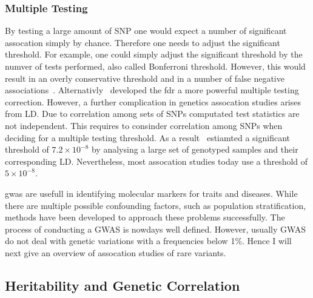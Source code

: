 \subsubsection{Multiple Testing}
\label{ssub:multiple_testing}
By testing a large amount of SNP one would expect a number of significant assocation simply by chance.
Therefore one needs to adjust the significant threshold.
For example, one could simply adjust the significant threshold by the numver of tests performed, also called Bonferroni threshold.
However, this would result in an overly conservative threshold and in a number of false negative associations~\cite{Benjamini1995}.
Alternativly~\citet{Benjamini1995} developed the \acrfull{fdr} a more powerful multiple testing correction. 
However, a further complication in genetics assocation studies arises from LD\@.
Due to correlation among sets of SNPs computated test statistics are not independent.
This requires to consinder correlation among SNPs when deciding for a multiple testing threshold.
As a result~\citet{Dudbridge2008} estiamted a significant threshold of $7.2 \times 10^{-8}$ by analysing a large set of genotyped samples and their corresponding LD\@.
Nevertheless, most assocation studies today use a threshold of $5\times 10^{-8}$. %

\acrshort{gwas} are usefull in identifying molecular markers for traits and diseases.
While there are multiple possible confounding factors, such as population stratification, methods have been developed to approach these problems successfully.
The process of conducting a GWAS is nowdays well defined.
However, usually GWAS do not deal with genetic variations with a frequencies below 1\%.
Hence I will next give an overview of assocation studies of rare variants.

\subsection{Heritability and Genetic Correlation}
\label{sub:heritability_and_genetic_correlation}

